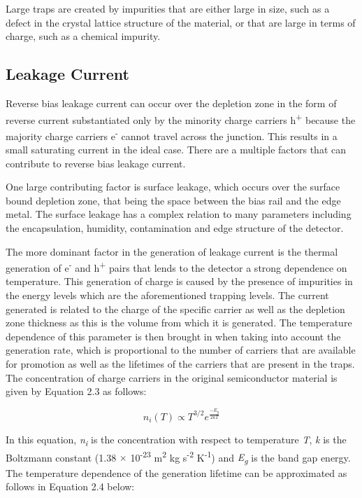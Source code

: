 \documentclass[letterpaper, 11pt]{report}
\begin{document}
Large traps are created by impurities that are either large in size, such as a defect in the crystal lattice structure of the material, or that are large in terms of charge, such as a chemical impurity.


\subsection{Leakage Current}
Reverse bias leakage current can occur over the depletion zone in the form of reverse current substantiated only by the minority charge carriers h\textsuperscript{+} because the majority charge carriers e\textsuperscript{-} cannot travel across the junction.  This results in a small saturating current in the ideal case.  There are a multiple factors that can contribute to reverse bias leakage current.

One large contributing factor is surface leakage, which occurs over the surface bound depletion zone, that being the space between the bias rail and the edge metal.  The surface leakage has a complex relation to many parameters including the encapsulation, humidity, contamination and edge structure of the detector.

The more dominant factor in the generation of leakage current is the thermal generation of e\textsuperscript{-} and h\textsuperscript{+} pairs that lends to the detector a strong dependence on temperature.  This generation of charge is caused by the presence of impurities in the energy levels which are the aforementioned trapping levels.  The current generated is related to the charge of the specific carrier as well as the depletion zone thickness as this is the volume from which it is generated.  The temperature dependence of this parameter is then brought in when taking into account the generation rate, which is proportional to the number of carriers that are available for promotion as well as the lifetimes of the carriers that are present in the traps.  The concentration of charge carriers in the original semiconductor material is given by Equation 2.3 as follows:

\begin{equation}
n_i (T)     \propto     T^{3/2} e^{\frac{-E_g}{2kT}}
\end{equation}

In this equation, \textit{n\textsubscript{i}} is the concentration with respect to temperature \textit{T}, \textit{k} is the Boltzmann constant (1.38 $\times$ 10\textsuperscript{-23} m\textsuperscript{2} kg s\textsuperscript{-2} K\textsuperscript{-1}) and \textit{E\textsubscript{g}} is the band gap energy.  The temperature dependence of the generation lifetime can be approximated as follows in Equation 2.4 below:
\end{document}
